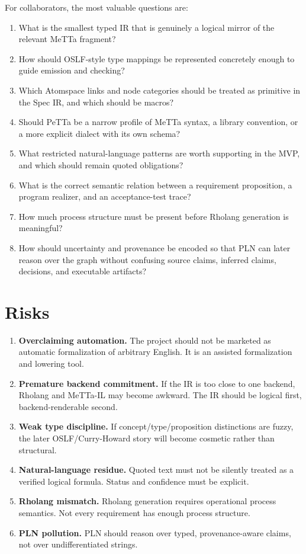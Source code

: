 \documentclass[11pt]{article}
\begin{document}
For collaborators, the most valuable questions are:
\begin{enumerate}
  \item What is the smallest typed IR that is genuinely a logical mirror of the
        relevant MeTTa fragment?
  \item How should OSLF-style type mappings be represented concretely enough to
        guide emission and checking?
  \item Which Atomspace links and node categories should be treated as primitive
        in the Spec IR, and which should be macros?
  \item Should PeTTa be a narrow profile of MeTTa syntax, a library convention,
        or a more explicit dialect with its own schema?
  \item What restricted natural-language patterns are worth supporting in the
        MVP, and which should remain quoted obligations?
  \item What is the correct semantic relation between a requirement proposition,
        a program realizer, and an acceptance-test trace?
  \item How much process structure must be present before Rholang generation is
        meaningful?
  \item How should uncertainty and provenance be encoded so that PLN can later
        reason over the graph without confusing source claims, inferred claims,
        decisions, and executable artifacts?
\end{enumerate}

\section{Risks}

\begin{enumerate}
  \item \textbf{Overclaiming automation.} The project should not be marketed as
        automatic formalization of arbitrary English.  It is an assisted
        formalization and lowering tool.
  \item \textbf{Premature backend commitment.} If the IR is too close to one
        backend, Rholang and MeTTa-IL may become awkward.  The IR should be
        logical first, backend-renderable second.
  \item \textbf{Weak type discipline.} If concept/type/proposition distinctions
        are fuzzy, the later OSLF/Curry-Howard story will become cosmetic rather
        than structural.
  \item \textbf{Natural-language residue.} Quoted text must not be silently
        treated as a verified logical formula.  Status and confidence must be
        explicit.
  \item \textbf{Rholang mismatch.} Rholang generation requires operational
        process semantics.  Not every requirement has enough process structure.
  \item \textbf{PLN pollution.} PLN should reason over typed, provenance-aware
        claims, not over undifferentiated strings.
\end{enumerate}
\end{document}
